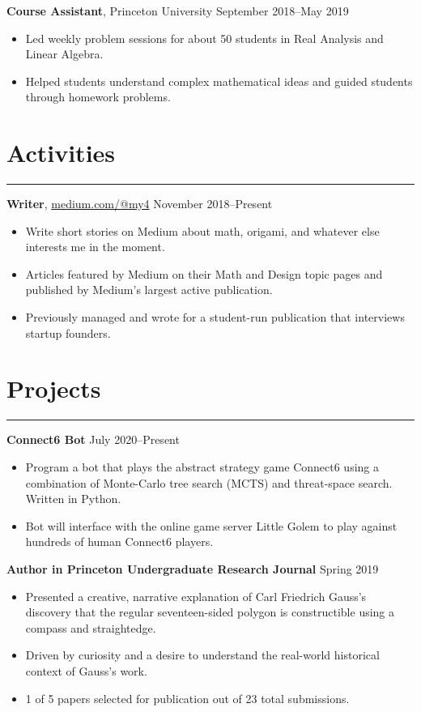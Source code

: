 \documentclass[10pt]{article}
\newcommand{\resumesection}[1]{\vspace{-0.2cm}\section*{#1}\vspace{-0.2cm}\hrule\vspace{0.2cm}}
\begin{document}
\textbf{Course Assistant}, Princeton University \hfill September 2018--May 2019
\begin{itemize}
	\item Led weekly problem sessions for about 50 students in Real Analysis and Linear Algebra.
	\item Helped students understand complex mathematical ideas and guided students through homework problems.
\end{itemize}

\resumesection{Activities}

\textbf{Writer}, \href{https://medium.com/@my4}{medium.com/@my4} \hfill November 2018--Present
\begin{itemize}
	\item Write short stories on Medium about math, origami, and whatever else interests me in the moment.
	\item Articles featured by Medium on their Math and Design topic pages and published by Medium's largest active publication.
	\item Previously managed and wrote for a student-run publication that interviews startup founders.
\end{itemize}

\resumesection{Projects}

\textbf{Connect6 Bot} \hfill July 2020--Present
\begin{itemize}
	\item Program a bot that plays the abstract strategy game Connect6 using a combination of Monte-Carlo tree search (MCTS) and threat-space search. Written in Python.
	\item Bot will interface with the online game server Little Golem to play against hundreds of human Connect6 players.
\end{itemize}

\textbf{Author in Princeton Undergraduate Research Journal} \hfill Spring 2019
\begin{itemize}
	\item Presented a creative, narrative explanation of Carl Friedrich Gauss's discovery that the regular seventeen-sided polygon is constructible using a compass and straightedge.
	\item Driven by curiosity and a desire to understand the real-world historical context of Gauss's work.
	\item 1 of 5 papers selected for publication out of 23 total submissions.
\end{itemize}
\end{document}
